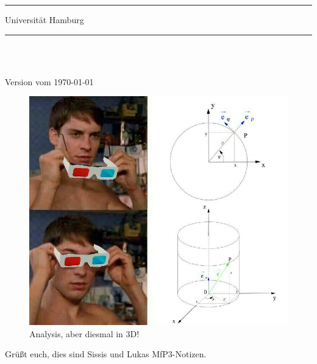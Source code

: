 

\setlength{\abovedisplayskip}{3pt}
\setlength{\belowdisplayskip}{3pt}
\setlength{\abovedisplayshortskip}{3pt}
\setlength{\belowdisplayshortskip}{3pt}

	\thispagestyle{empty}
	\rule{\linewidth}{1pt}
	
	\vspace{6pt}				%
	
	\begin{minipage}{0.6\textwidth}
		\begin{flushleft} 
		\Profs
		\end{flushleft}
	\end{minipage}
	\begin{minipage}{0.39\textwidth}
		\begin{flushright}
			Universität Hamburg
		\end{flushright}
	\end{minipage}

	\rule{\linewidth}{1pt}\\
	\begin{center}
		\Large{\textsf{\titel}}\\
		\small\textsf{Version vom \today}
\vspace{8pt}
\end{center}


\begin{figure}[htbp]
    \centering
    \includegraphics[width=.55\textwidth]{Dateien/3D_Analysis.jpg}\\
    Analysis, aber diesmal in 3D!\\
\end{figure}
\vfill
Grüßt euch, dies sind Sissis und Lukas MfP3-Notizen. \\

